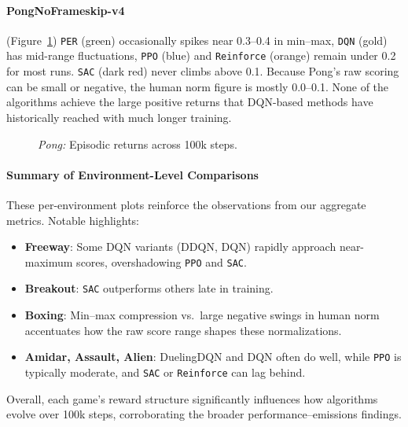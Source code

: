 \paragraph{PongNoFrameskip-v4}
(Figure~\ref{fig:pong_comparison_combined})
\texttt{PER} (green) occasionally spikes near 0.3--0.4 in min--max, 
\texttt{DQN} (gold) has mid-range fluctuations, 
\texttt{PPO} (blue) and \texttt{Reinforce} (orange) remain under 0.2 for most runs. 
\texttt{SAC} (dark red) never climbs above 0.1. 
Because Pong's raw scoring can be small or negative, 
the human norm figure is mostly 0.0--0.1. None of the algorithms achieve 
the large positive returns that DQN-based methods have historically 
reached with much longer training.

\begin{figure} 
	\centering
	\quad
	\caption{\emph{Pong:} Episodic returns across 100k steps.}
	\label{fig:pong_comparison_combined}
\end{figure}

\paragraph{Summary of Environment-Level Comparisons}
These per-environment plots reinforce the observations from our aggregate metrics.
Notable highlights:
\begin{itemize}
	\item \textbf{Freeway}: Some DQN variants (DDQN, DQN) rapidly approach near-maximum 
	scores, overshadowing \texttt{PPO} and \texttt{SAC}.
	\item \textbf{Breakout}: \texttt{SAC} outperforms others late in training.
	\item \textbf{Boxing}: Min--max compression vs.\ large negative swings in human norm 
	accentuates how the raw score range shapes these normalizations.
	\item \textbf{Amidar, Assault, Alien}: DuelingDQN and DQN often do well, 
	while \texttt{PPO} is typically moderate, and \texttt{SAC} or \texttt{Reinforce} 
	can lag behind.
\end{itemize}
Overall, each game's reward structure significantly influences how algorithms evolve 
over 100k steps, corroborating the broader performance–emissions findings.

